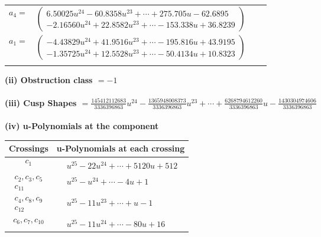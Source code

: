 \documentclass[1p]{elsarticle_modified}
\theoremstyle{definition}
\begin{document}
\begin{tabular}{m{7pt} m{180pt} m{7pt} m{180pt} }
\flushright $a_{4}=$&$\begin{pmatrix}6.50025 u^{24}-60.8358 u^{23}+\cdots+275.705 u-62.6895\\-2.16560 u^{24}+22.8582 u^{23}+\cdots-153.338 u+36.8239\end{pmatrix}$ \\
\flushright $a_{1}=$&$\begin{pmatrix}-4.43829 u^{24}+41.9516 u^{23}+\cdots-195.816 u+43.9195\\-1.35725 u^{24}+12.5528 u^{23}+\cdots-50.4134 u+10.8323\end{pmatrix}$\\&\end{tabular}
\flushleft \textbf{(ii) Obstruction class $= -1$}\\~\\
\flushleft \textbf{(iii) Cusp Shapes $= \frac{145412112683}{3336396863} u^{24}-\frac{1365948008373}{3336396863} u^{23}+\cdots+\frac{6268794612260}{3336396863} u-\frac{1430304974606}{3336396863}$}\\~\\
\newpage\renewcommand{\arraystretch}{1}
\flushleft \textbf{(iv) u-Polynomials at the component}\newline \\
\begin{tabular}{m{50pt}|m{274pt}}
Crossings & \hspace{64pt}u-Polynomials at each crossing \\
\hline $$\begin{aligned}c_{1}\end{aligned}$$&$\begin{aligned}
&u^{25}-22 u^{24}+\cdots+5120 u+512
\end{aligned}$\\
\hline $$\begin{aligned}c_{2},c_{3},c_{5}\\c_{11}\end{aligned}$$&$\begin{aligned}
&u^{25}- u^{24}+\cdots-4 u+1
\end{aligned}$\\
\hline $$\begin{aligned}c_{4},c_{8},c_{9}\\c_{12}\end{aligned}$$&$\begin{aligned}
&u^{25}-11 u^{23}+\cdots+u-1
\end{aligned}$\\
\hline $$\begin{aligned}c_{6},c_{7},c_{10}\end{aligned}$$&$\begin{aligned}
&u^{25}-11 u^{24}+\cdots-80 u+16
\end{aligned}$\\
\hline
\end{tabular}\\~\\
\end{document}
